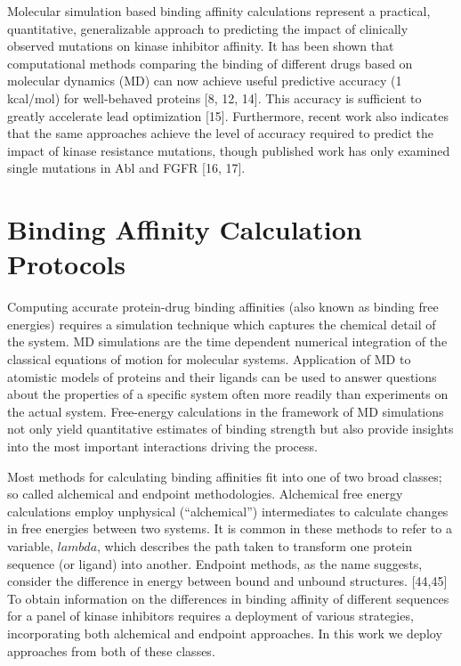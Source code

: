 \documentclass[conference]{IEEEtran}
\begin{document}
Molecular simulation based binding affinity calculations represent a practical, quantitative, generalizable approach to predicting the impact of clinically observed mutations on kinase inhibitor affinity. It has been shown that computational methods comparing the binding of different drugs based on molecular dynamics (MD) can now achieve useful predictive accuracy (1 kcal/mol) for well-behaved proteins [8, 12, 14]. This accuracy is sufficient to greatly accelerate lead optimization [15]. Furthermore, recent work also indicates that the same approaches achieve the level of accuracy required to predict the impact of kinase resistance mutations, though published work has only examined single mutations in Abl and FGFR [16, 17].

\section{Binding Affinity Calculation Protocols}\label{sec:bac}

Computing accurate protein-drug binding affinities (also known as binding free energies) requires a simulation technique which captures the chemical detail of the system. MD simulations are the time dependent numerical integration of the classical equations of motion for molecular systems. Application of MD to atomistic models of proteins and their ligands can be used to answer questions about the properties of a specific system often more readily than experiments on the actual system. Free-energy calculations in the framework of MD simulations not only yield quantitative estimates of binding strength but also provide insights into the most important interactions driving the process.

Most methods for calculating binding affinities fit into one of two broad classes; so called alchemical and endpoint methodologies. Alchemical free energy calculations employ unphysical (“alchemical”) intermediates to calculate changes in free energies between two systems. It is common in these methods to refer to a variable, $lambda$, which describes the path taken to transform one protein sequence (or ligand) into another. Endpoint methods, as the name suggests, consider the difference in energy between bound and unbound structures. [44,45] To obtain information on the differences in binding affinity of different sequences for a panel of kinase inhibitors requires a deployment of various strategies, incorporating both alchemical and endpoint approaches. In this work we deploy approaches from both of these classes.
\end{document}
